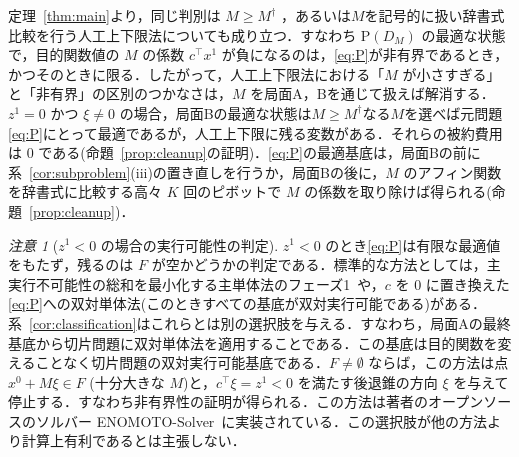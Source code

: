 \documentclass[11pt,a4paper]{ltjsarticle}
\theoremstyle{plain}
\theoremstyle{definition}
\theoremstyle{remark}
\newtheorem{remark}[theorem]{注意}
\newcommand{\Pb}{\mathrm{P}}
\begin{document}
定理~\ref{thm:main}より，同じ判別は $M\ge M^\dagger$ ，あるいは$M$を記号的に扱い辞書式比較を行う人工上下限法についても成り立つ．すなわち $\Pb(D_M)$ の最適な状態で，目的関数値の $M$ の係数 $c^\top x^1$ が負になるのは，\eqref{eq:P}が非有界であるとき，かつそのときに限る．したがって，人工上下限法における「$M$ が小さすぎる」と「非有界」の区別のつかなさは，$M$ を局面A，Bを通じて扱えば解消する．$z^1=0$ かつ $\xi\neq0$ の場合，局面Bの最適な状態は$M\ge M^\dagger$なる$M$を選べば元問題\eqref{eq:P}にとって最適であるが，人工上下限に残る変数がある．それらの被約費用は $0$ である(命題~\ref{prop:cleanup}の証明)．\eqref{eq:P}の最適基底は，局面Bの前に系~\ref{cor:subproblem}(iii)の置き直しを行うか，局面Bの後に，$M$ のアフィン関数を辞書式に比較する高々 $K$ 回のピボットで $M$ の係数を取り除けば得られる(命題~\ref{prop:cleanup})．

\begin{remark}[$z^1<0$ の場合の実行可能性の判定]
\label{rem:feasibility}
$z^1<0$ のとき\eqref{eq:P}は有限な最適値をもたず，残るのは $F$ が空かどうかの判定である．標準的な方法としては，主実行不可能性の総和を最小化する主単体法のフェーズ1~\cite{chvatal1983,bertsimas1997}や，$c$ を $0$ に置き換えた\eqref{eq:P}への双対単体法(このときすべての基底が双対実行可能である)がある．系~\ref{cor:classification}はこれらとは別の選択肢を与える．すなわち，局面Aの最終基底から切片問題に双対単体法を適用することである．この基底は目的関数を変えることなく切片問題の双対実行可能基底である．$F\neq\emptyset$ ならば，この方法は点 $x^0+M\xi\in F$ (十分大きな $M$)と，$c^\top\xi=z^1<0$ を満たす後退錐の方向 $\xi$ を与えて停止する．すなわち非有界性の証明が得られる．この方法は著者のオープンソースのソルバー ENOMOTO-Solver~\cite{enomotosolver}に実装されている．この選択肢が他の方法より計算上有利であるとは主張しない．
\end{remark}
\end{document}
